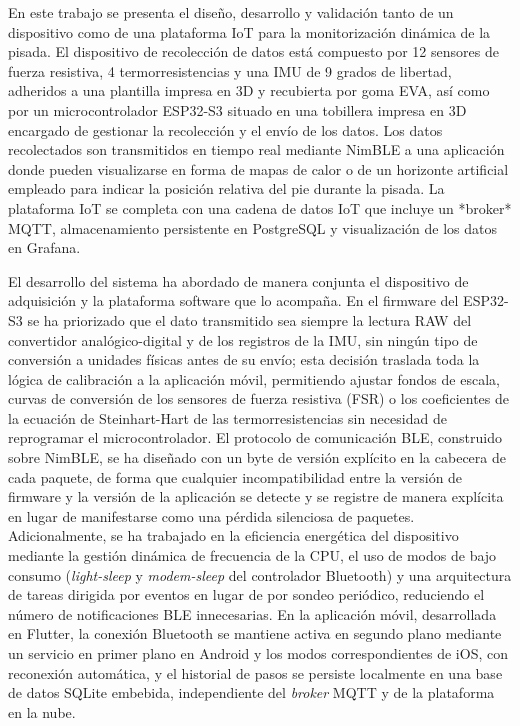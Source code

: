 En este trabajo se presenta el diseño, desarrollo y validación tanto de un dispositivo como de una plataforma IoT para la monitorización dinámica de la pisada. El dispositivo de recolección de datos está compuesto por 12 sensores de fuerza resistiva, 4 termorresistencias y una IMU de 9 grados de libertad, adheridos a una plantilla impresa en 3D y recubierta por goma EVA, así como por un microcontrolador ESP32-S3 situado en una tobillera impresa en 3D encargado de gestionar la recolección y el envío de los datos. Los datos recolectados son transmitidos en tiempo real mediante NimBLE a una aplicación donde pueden visualizarse en forma de mapas de calor o de un horizonte artificial empleado para indicar la posición relativa del pie durante la pisada. La plataforma IoT se completa con una cadena de datos IoT que incluye un *broker* MQTT, almacenamiento persistente en PostgreSQL y visualización de los datos en Grafana.

\begin{IAtext}
El desarrollo del sistema ha abordado de manera conjunta el dispositivo de adquisición y la plataforma software que lo acompaña. En el firmware del ESP32-S3 se ha priorizado que el dato transmitido sea siempre la lectura RAW del convertidor analógico-digital y de los registros de la IMU, sin ningún tipo de conversión a unidades físicas antes de su envío; esta decisión traslada toda la lógica de calibración a la aplicación móvil, permitiendo ajustar fondos de escala, curvas de conversión de los sensores de fuerza resistiva (FSR) o los coeficientes de la ecuación de Steinhart-Hart de las termorresistencias sin necesidad de reprogramar el microcontrolador. El protocolo de comunicación BLE, construido sobre NimBLE, se ha diseñado con un byte de versión explícito en la cabecera de cada paquete, de forma que cualquier incompatibilidad entre la versión de firmware y la versión de la aplicación se detecte y se registre de manera explícita en lugar de manifestarse como una pérdida silenciosa de paquetes. Adicionalmente, se ha trabajado en la eficiencia energética del dispositivo mediante la gestión dinámica de frecuencia de la CPU, el uso de modos de bajo consumo (\textit{light-sleep} y \textit{modem-sleep} del controlador Bluetooth) y una arquitectura de tareas dirigida por eventos en lugar de por sondeo periódico, reduciendo el número de notificaciones BLE innecesarias. En la aplicación móvil, desarrollada en Flutter, la conexión Bluetooth se mantiene activa en segundo plano mediante un servicio en primer plano en Android y los modos correspondientes de iOS, con reconexión automática, y el historial de pasos se persiste localmente en una base de datos SQLite embebida, independiente del \textit{broker} MQTT y de la plataforma en la nube.
\end{IAtext}

